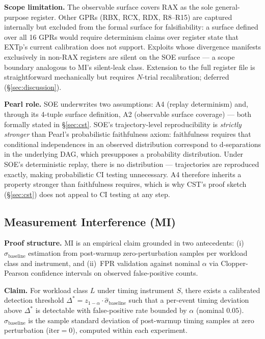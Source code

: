 \documentclass[conference]{IEEEtran}
\newcommand{\sigbase}{\hat{\sigma}_\text{baseline}}
\newcommand{\Dstar}{\Delta^{*}}
\begin{document}
\textbf{Scope limitation.} The observable surface covers RAX as the
sole general-purpose register. Other GPRs (RBX, RCX, RDX, R8--R15)
are captured internally but excluded from the formal surface for
falsifiability: a surface defined over all 16 GPRs would require
determinism claims over register state that EXTp's current
calibration does not support. Exploits whose divergence manifests
exclusively in non-RAX registers are silent on the SOE surface ---
a scope boundary analogous to MI's silent-leak class. Extension to
the full register file is straightforward mechanically but requires
$N$-trial recalibration; deferred (\S\ref{sec:discussion}).

\textbf{Pearl role.} SOE underwrites two assumptions: A4 (replay
determinism) and, through its 4-tuple surface definition, A2
(observable surface coverage) --- both formally stated in
\S\ref{sec:cst}. SOE's trajectory-level reproducibility is
\emph{strictly stronger} than Pearl's probabilistic faithfulness
axiom: faithfulness requires that conditional independences in an
observed distribution correspond to d-separations in the underlying
DAG, which presupposes a probability distribution. Under SOE's
deterministic replay, there is no distribution --- trajectories are
reproduced exactly, making probabilistic CI testing unnecessary. A4
therefore inherits a property stronger than faithfulness requires,
which is why CST's proof sketch (\S\ref{sec:cst}) does not appeal to
CI testing at any step.

\subsection{Measurement Interference (MI)}\label{sec:mi}

\textbf{Proof structure.} MI is an empirical claim grounded in two
antecedents: (i)~$\sigbase$ estimation from post-warmup
zero-perturbation samples per workload class and instrument, and
(ii)~FPR validation against nominal $\alpha$ via Clopper-Pearson
confidence intervals on observed false-positive counts.

\textbf{Claim.} For workload class $L$ under timing instrument $S$,
there exists a calibrated detection threshold $\Dstar = z_{1-\alpha}
\cdot \sigbase$ such that a per-event timing deviation above
$\Dstar$ is detectable with false-positive rate bounded by $\alpha$
(nominal $0.05$). $\sigbase$ is the sample standard deviation of
post-warmup timing samples at zero perturbation ($\text{iter}{=}0$),
computed within each experiment.
\end{document}
